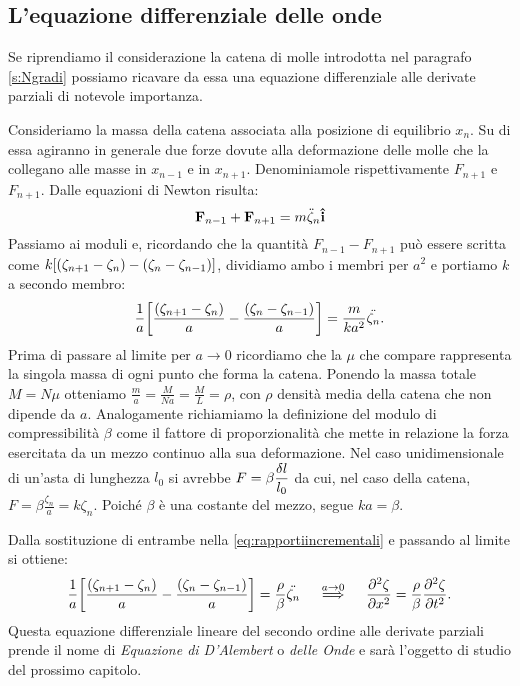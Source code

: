     \subsection{L'equazione differenziale delle onde}
        Se riprendiamo il considerazione la catena di molle introdotta nel paragrafo \ref{s:Ngradi} possiamo ricavare da essa una equazione differenziale alle derivate parziali di notevole importanza.
        \par Consideriamo la massa della catena associata alla posizione di equilibrio $x_n$. Su di essa agiranno in generale due forze dovute alla deformazione delle molle che la collegano alle masse in $x_{n-1}$ e in $x_{n+1}$. Denominiamole rispettivamente $F_{n+1}$ e $F_{n+1}$. Dalle equazioni di Newton risulta:
            $$\vb{F}_{n-1}+\vb{F}_{n+1}=m\ddot{\zeta}_n\vu{i}$$
        Passiamo ai moduli e, ricordando che la quantit\`a $F_{n-1}-F_{n+1}$ pu\`o essere scritta come $k\qty[\qty(\zeta_{n+1}-\zeta_n)-\qty(\zeta_{n}-\zeta_{n-1})]$, dividiamo ambo i membri per $a^2$ e portiamo $k$ a secondo membro:
        \begin{equation}
            \frac{1}{a}\qty[\frac{\qty(\zeta_{n+1}-\zeta_n)}{a}-\frac{\qty(\zeta_{n}-\zeta_{n-1})}{a}]=\frac{m}{ka^2}\ddot{\zeta_n}.
            \label{eq:rapportiincrementali}
        \end{equation}
        Prima di passare al limite per $a\to 0$ ricordiamo che la $\mu$ che compare rappresenta la singola massa di ogni punto che forma la catena. Ponendo la massa totale $M=N\mu$ otteniamo $\displaystyle\frac{m}{a}=\frac{M}{Na}=\frac{M}{L}=\rho$, con $\rho$ densit\`a media della catena che non dipende da $a$. Analogamente richiamiamo la definizione del modulo di compressibilit\`a $\beta$ come il fattore di proporzionalit\`a che mette in relazione la forza esercitata da un mezzo continuo alla sua deformazione. Nel caso unidimensionale di un'asta di lunghezza $l_0$ si avrebbe $\displaystyle F=\beta\frac{\var{l}}{l_0}$ da cui, nel caso della catena, $\displaystyle F=\beta\frac{\zeta_n}{a}=k\zeta_n$. Poich\'e $\beta$ \`e una costante del mezzo, segue $ka=\beta$.
        \par Dalla sostituzione di entrambe nella \eqref{eq:rapportiincrementali} e passando al limite si ottiene:
        \begin{equation}
            \frac{1}{a}\qty[\frac{\qty(\zeta_{n+1}-\zeta_n)}{a}-\frac{\qty(\zeta_{n}-\zeta_{n-1})}{a}]=\frac{\rho}{\beta}\ddot{\zeta_n}\quad\overset{a\to 0}{\implies}\quad\pdv[2]{\zeta}{x}=\frac{\rho}{\beta}\pdv[2]{\zeta}{t}.
            \label{eq:dalembert:1}
        \end{equation}
        Questa equazione differenziale lineare del secondo ordine alle derivate parziali prende il nome di \emph{Equazione di D'Alembert} o \emph{delle Onde} e sar\`a l'oggetto di studio del prossimo capitolo.